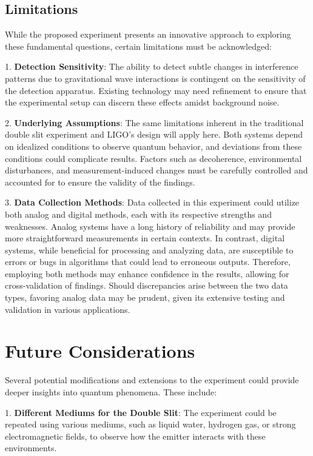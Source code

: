 \documentclass{article}
\begin{document}
\subsection{Limitations}
While the proposed experiment presents an innovative approach to exploring these fundamental questions, certain limitations must be acknowledged:

1. \textbf{Detection Sensitivity}: The ability to detect subtle changes in interference patterns due to gravitational wave interactions is contingent on the sensitivity of the detection apparatus. Existing technology may need refinement to ensure that the experimental setup can discern these effects amidst background noise.

2. \textbf{Underlying Assumptions}: The same limitations inherent in the traditional double slit experiment and LIGO's design will apply here. Both systems depend on idealized conditions to observe quantum behavior, and deviations from these conditions could complicate results. Factors such as decoherence, environmental disturbances, and measurement-induced changes must be carefully controlled and accounted for to ensure the validity of the findings.

3. \textbf{Data Collection Methods}: Data collected in this experiment could utilize both analog and digital methods, each with its respective strengths and weaknesses. Analog systems have a long history of reliability and may provide more straightforward measurements in certain contexts. In contrast, digital systems, while beneficial for processing and analyzing data, are susceptible to errors or bugs in algorithms that could lead to erroneous outputs. Therefore, employing both methods may enhance confidence in the results, allowing for cross-validation of findings. Should discrepancies arise between the two data types, favoring analog data may be prudent, given its extensive testing and validation in various applications.

\section{Future Considerations}

Several potential modifications and extensions to the experiment could provide deeper insights into quantum phenomena. These include:

1. \textbf{Different Mediums for the Double Slit}: The experiment could be repeated using various mediums, such as liquid water, hydrogen gas, or strong electromagnetic fields, to observe how the emitter interacts with these environments. 
\end{document}
